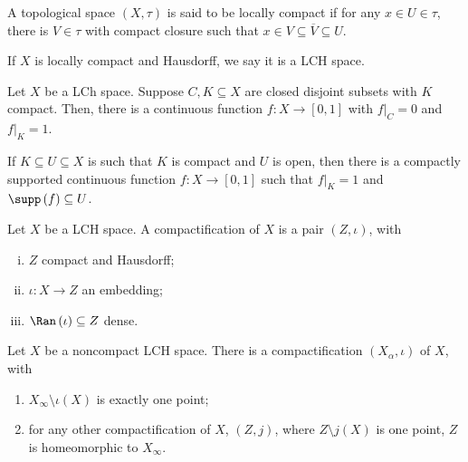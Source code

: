 \begin{definition}
  A topological space $\left(X,\tau\right)$ is said to be locally compact if for any $x\in U\in \tau$, there is $V\in \tau$ with compact closure such that $x\in V\subseteq \overline{V}\subseteq U$.\newline

  If $X$ is locally compact and Hausdorff, we say it is a LCH space.
\end{definition}
\begin{theorem}
  Let $X$ be a LCh space. Suppose $C,K\subseteq X$ are closed disjoint subsets with $K$ compact. Then, there is a continuous function $f\colon X\rightarrow [0,1]$ with $f|_{C} = 0$ and $f|_{K} = 1$.\newline

  If $K\subseteq U\subseteq X$ is such that $K$ is compact and $U$ is open, then there is a compactly supported continuous function $f\colon X\rightarrow [0,1]$ such that $f|_{K} = 1$ and $\supp\left(f\right)\subseteq U$.
\end{theorem}
\begin{definition}
  Let $X$ be a LCH space. A compactification of $X$ is a pair $\left(Z,\iota\right)$, with
  \begin{enumerate}[(i)]
    \item $Z$ compact and Hausdorff;
    \item $\iota\colon X\rightarrow Z$ an embedding;
    \item $\Ran\left(\iota\right)\subseteq Z$ dense.
  \end{enumerate}
\end{definition}
\begin{theorem}
  Let $X$ be a noncompact LCH space. There is a compactification $\left(X_{\alpha},\iota\right)$ of $X$, with
  \begin{enumerate}[(1)]
    \item $X_{\infty}\setminus \iota(X)$ is exactly one point;
    \item for any other compactification of $X$, $\left(Z,j\right)$, where $Z\setminus j(X)$ is one point, $Z$ is homeomorphic to $X_{\infty}$.
  \end{enumerate}
\end{theorem}
